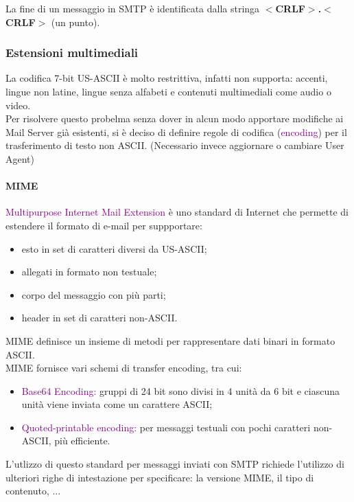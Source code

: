 \newblock
La fine di un messaggio in SMTP è identificata dalla stringa \textbf{$<$CRLF$>$.$<$CRLF$>$} (un punto).
\newpage
\subsubsection{Estensioni multimediali} 
La codifica 7-bit US-ASCII è molto restrittiva, infatti non supporta: accenti, lingue non latine, lingue senza alfabeti e contenuti multimediali come audio o video.
\\Per risolvere questo probelma senza dover in alcun modo apportare modifiche ai Mail Server già esistenti, si è deciso di definire regole di codifica (\textcolor{purple}{encoding}) per il trasferimento di testo non ASCII. (Necessario invece aggiornare o cambiare User Agent)

\paragraph{MIME}
\textcolor{purple}{Multipurpose Internet Mail Extension} è uno standard di Internet che permette di estendere il formato di e-mail per suppportare:
\begin{itemize}
    \item esto in set di caratteri diversi da US-ASCII;
    \item allegati in formato non testuale;
    \item corpo del messaggio con più parti;
    \item header in set di caratteri non-ASCII.
\end{itemize}
MIME definisce un insieme di metodi per rappresentare dati binari in formato ASCII.
\\MIME fornisce vari schemi di transfer encoding, tra cui:
\begin{itemize}
    \item \textcolor{purple}{Base64 Encoding:} gruppi di 24 bit sono divisi in 4 unità da 6 bit e ciascuna unità viene inviata come un carattere ASCII;
    \item \textcolor{purple}{Quoted-printable encoding:} per messaggi testuali con pochi caratteri non-ASCII, più efficiente.
\end{itemize}

L'utlizzo di questo standard per messaggi inviati con SMTP richiede l'utilizzo di ulteriori righe di intestazione per specificare: la versione MIME, il tipo di contenuto, ...

